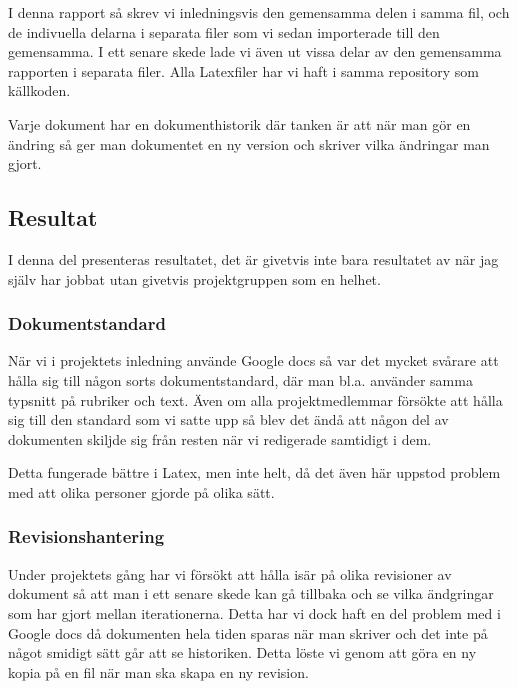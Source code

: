 I denna rapport så skrev vi inledningsvis den gemensamma delen i samma fil, och de indivuella delarna i separata filer som vi sedan importerade till den gemensamma. I ett senare skede lade vi även ut vissa delar av den gemensamma rapporten i separata filer. Alla Latexfiler har vi haft i samma repository som källkoden.

Varje dokument har en dokumenthistorik där tanken är att när man gör en ändring så ger man dokumentet en ny version och skriver vilka ändringar man gjort.


\subsection{Resultat}
I denna del presenteras resultatet, det är givetvis inte bara resultatet av när jag själv har jobbat utan givetvis projektgruppen som en helhet.

\subsubsection{Dokumentstandard}
När vi i projektets inledning använde Google docs så var det mycket svårare att hålla sig till någon sorts dokumentstandard, där man bl.a. använder samma typsnitt på rubriker och text. Även om alla projektmedlemmar försökte att hålla sig till den standard som vi satte upp så blev det ändå att någon del av dokumenten skiljde sig från resten när vi redigerade samtidigt i dem.

Detta fungerade bättre i Latex, men inte helt, då det även här uppstod problem med att olika personer gjorde på olika sätt.

\subsubsection{Revisionshantering}
Under projektets gång har vi försökt att hålla isär på olika revisioner av dokument så att man i ett senare skede kan gå tillbaka och se vilka ändgringar som har gjort mellan iterationerna.
Detta har vi dock haft en del problem med i Google docs då dokumenten hela tiden sparas när man skriver och det inte på något smidigt sätt går att se historiken. Detta löste vi genom att göra en ny kopia på en fil när man ska skapa en ny revision.

